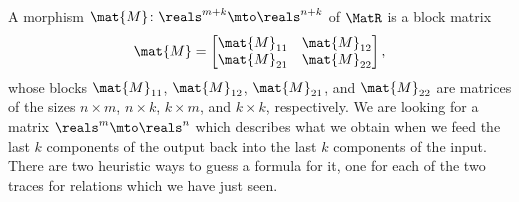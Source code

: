 A morphism $\mat{M} \colon \reals^{m+k} \mto \reals^{n+k}$ of $\MatR$ is a block matrix
\begin{equation}
    \label{eq:MatR-blocks}
    \mat{M} =
    \begin{bmatrix}
        \mat{M}_{11} & \mat{M}_{12} \\
        \mat{M}_{21} & \mat{M}_{22}
    \end{bmatrix},
\end{equation}
whose blocks $\mat{M}_{11}$, $\mat{M}_{12}$, $\mat{M}_{21}$, and $\mat{M}_{22}$ are matrices of the sizes $n \times m$, $n \times k$, $k \times m$, and $k \times k$, respectively.
We are looking for a matrix $\reals^m \mto \reals^n$ which describes what we obtain when we feed the last $k$ components of the output back into the last $k$ components of the input.
There are two heuristic ways to guess a formula for it, one for each of the two traces for relations which we have just seen.

